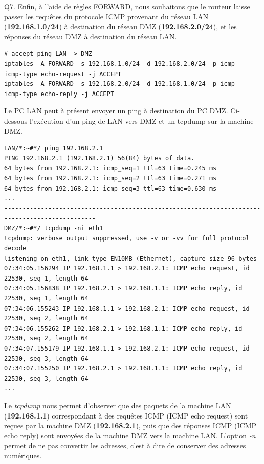\documentclass[frenchb, 11pt]{article}
\newlength{\leftbarwidth}
\newlength{\leftbarsep}
\newcommand*{\leftbarcolorcmd}{\color{leftbarcolor}} %
\renewenvironment{leftbar}{%
    \def\FrameCommand{{\leftbarcolorcmd{\vrule width \leftbarwidth\relax\hspace {\leftbarsep}}}}%
    \MakeFramed {\advance \hsize -\width \FrameRestore }%
}{%
    \endMakeFramed
}
\begin{document}
\begin{leftbar}
	\noindent Q7. Enfin, à l'aide de règles FORWARD, nous souhaitons que le routeur laisse passer les requêtes du protocole ICMP provenant du réseau LAN (\textbf{192.168.1.0/24}) à destination du réseau DMZ (\textbf{192.168.2.0/24}), et les réponses du réseau DMZ à destination du réseau LAN.
	\begin{lstlisting}[numbers=none]
# accept ping LAN -> DMZ
iptables -A FORWARD -s 192.168.1.0/24 -d 192.168.2.0/24 -p icmp --icmp-type echo-request -j ACCEPT
iptables -A FORWARD -s 192.168.2.0/24 -d 192.168.1.0/24 -p icmp --icmp-type echo-reply -j ACCEPT
	\end{lstlisting}
\end{leftbar}

Le PC LAN peut à présent envoyer un ping à destination du PC DMZ. Ci-dessous l'exécution d'un ping de LAN vers DMZ et un tcpdump sur la machine DMZ.
\begin{lstlisting}
LAN/*:~#*/ ping 192.168.2.1
PING 192.168.2.1 (192.168.2.1) 56(84) bytes of data.
64 bytes from 192.168.2.1: icmp_seq=1 ttl=63 time=0.245 ms
64 bytes from 192.168.2.1: icmp_seq=2 ttl=63 time=0.271 ms
64 bytes from 192.168.2.1: icmp_seq=3 ttl=63 time=0.630 ms
...
-----------------------------------------------------------------------------------------------
DMZ/*:~#*/ tcpdump -ni eth1
tcpdump: verbose output suppressed, use -v or -vv for full protocol decode
listening on eth1, link-type EN10MB (Ethernet), capture size 96 bytes
07:34:05.156294 IP 192.168.1.1 > 192.168.2.1: ICMP echo request, id 22530, seq 1, length 64
07:34:05.156838 IP 192.168.2.1 > 192.168.1.1: ICMP echo reply, id 22530, seq 1, length 64
07:34:06.155243 IP 192.168.1.1 > 192.168.2.1: ICMP echo request, id 22530, seq 2, length 64
07:34:06.155262 IP 192.168.2.1 > 192.168.1.1: ICMP echo reply, id 22530, seq 2, length 64
07:34:07.155179 IP 192.168.1.1 > 192.168.2.1: ICMP echo request, id 22530, seq 3, length 64
07:34:07.155250 IP 192.168.2.1 > 192.168.1.1: ICMP echo reply, id 22530, seq 3, length 64
...
\end{lstlisting}
Le \emph{tcpdump} nous permet d'observer que des paquets de la machine LAN (\textbf{192.168.1.1}) correspondant à des requêtes ICMP (ICMP echo request) sont reçues par la machine DMZ (\textbf{192.168.2.1}), puis que des réponses ICMP (ICMP echo reply) sont envoyées de la machine DMZ vers la machine LAN. L'option \emph{-n} permet de ne pas convertir les adresses, c'est à dire de conserver des adresses numériques.\\
\end{document}
